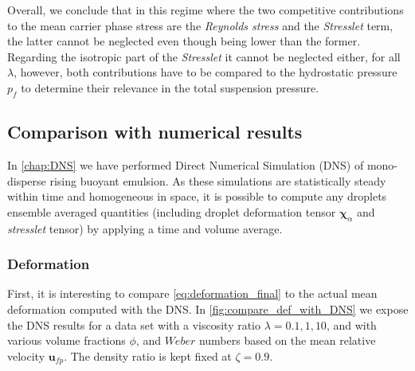Overall, we conclude that in this regime where the two competitive contributions to the mean carrier phase stress are the \textit{Reynolds stress} and the \textit{Stresslet} term, the latter cannot be neglected even though being lower than the former. 
Regarding the isotropic part of the \textit{Stresslet} it cannot be neglected either, for all $\lambda$, however, both contributions have to be compared to the hydrostatic pressure $p_f$ to determine their relevance in the total suspension pressure.

\subsection{Comparison with numerical results}

In \ref{chap:DNS} we have performed Direct Numerical Simulation (DNS) of mono-disperse rising buoyant emulsion. 
As these simulations are statistically steady within time and homogeneous in space, it is possible to compute any droplets ensemble averaged quantities (including droplet deformation tensor $\bm\chi_\alpha$ and \textit{stresslet} tensor) by applying a time and volume average.


\subsubsection{Deformation}

First, it is interesting to compare \ref{eq:deformation_final} to the actual mean deformation computed with the DNS. 
In \ref{fig:compare_def_with_DNS} we expose the DNS results for a data set with a viscosity ratio $\lambda = 0.1, 1, 10$, and with various volume fractions $\phi$,  and $Weber$ numbers based on the mean relative velocity $\textbf{u}_{fp}$. 
The density ratio is kept fixed at $\zeta = 0.9$. 

